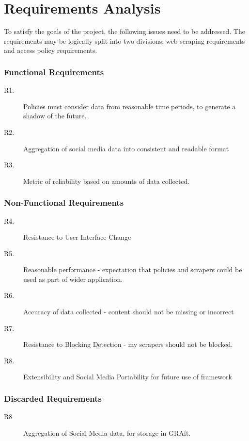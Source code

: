 \chapter{Requirements Analysis}\label{C:us}

To satisfy the goals of the project, the following issues need to be addressed. The requirements may be logically split into two divisions; web-scraping requirements and access policy requirements.

\subsection{Functional Requirements}

\begin{description}
 \item [R1.] Policies must consider data from reasonable time periods, to generate a shadow of the future.
 \item [R2.] Aggregation of social media data into consistent and readable format
 \item [R3.] Metric of reliability based on amounts of data collected.
\end{description}

\subsection{Non-Functional Requirements}

\begin{description}
 \item [R4.] Resistance to User-Interface Change
 \item [R5.] Reasonable performance - expectation that policies and scrapers could be used as part of wider application.
 \item [R6.] Accuracy of data collected - content should not be missing or incorrect
 \item [R7.] Resistance to Blocking Detection - my scrapers should not be blocked.
 \item [R8.] Extensibility and Social Media Portability for future use of framework
\end{description}

\subsection{Discarded Requirements}

\begin{description}
 \item [R8] Aggregation of Social Media data, for storage in GRAft.
\end{description}


